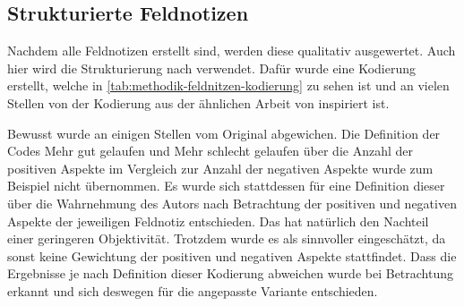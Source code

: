 

\subsection{Strukturierte Feldnotizen}
\label{sec:methodik-auswertung-feldnotizen}

Nachdem alle Feldnotizen erstellt sind, werden diese qualitativ ausgewertet.
Auch hier wird die Strukturierung nach  verwendet.
Dafür wurde eine Kodierung erstellt, welche in \cref{tab:methodik-feldnitzen-kodierung} zu sehen ist und an vielen Stellen von der Kodierung aus der ähnlichen Arbeit von  inspiriert ist.



Bewusst wurde an einigen Stellen vom Original abgewichen.
Die Definition der Codes \glqq Mehr gut gelaufen\grqq{} und \glqq Mehr schlecht gelaufen\grqq{} über die Anzahl der positiven Aspekte im Vergleich zur Anzahl der negativen Aspekte wurde zum Beispiel nicht übernommen.
Es wurde sich stattdessen für eine Definition dieser über die Wahrnehmung des Autors nach Betrachtung der positiven und negativen Aspekte der jeweiligen Feldnotiz entschieden.
Das hat natürlich den Nachteil einer geringeren Objektivität.
Trotzdem wurde es als sinnvoller eingeschätzt, da sonst keine Gewichtung der positiven und negativen Aspekte stattfindet.
Dass die Ergebnisse je nach Definition dieser Kodierung abweichen wurde bei Betrachtung erkannt und sich deswegen für die angepasste Variante entschieden.

